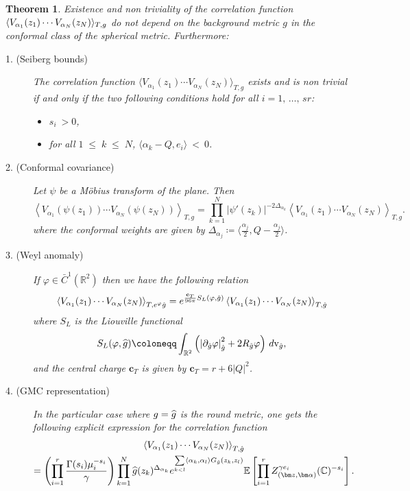 \documentclass[10pt]{amsart}
\newtheorem{theo}{Theorem}[section]
\theoremstyle{definition}\newtheorem{defi}[theo]{Definition}\newtheorem{rema}[theo]{Remark}\newtheorem{exam}[theo]{Example}\newtheorem{exem}[theo]{Example}\newtheorem{nota}[theo]{Notation}
\renewcommand{\leq}{\;\leqslant\;}
\newcommand{\rmv}{\mathrm{v}}
\newcommand{\C}{\mathbb{C}}
\newcommand{\R}{\mathbb{R}}
\newcommand{\E}{\mathbb{E}}
\newcommand{\bfc}{\mathbf{c}}
\newcommand{\ps}[1]{\langle #1 \rangle}
\let\oldhat\hat
\renewcommand*{\hat}[1]{\mathchoice{\widehat{#1}}{\widehat{#1}}{\oldhat{#1}}{\oldhat{#1}}}
\begin{document}
\begin{theo}\label{propcorrel1}
Existence and non triviality of the correlation function $ \langle V_{\alpha_1}(z_1)\linebreak \cdots V_{\alpha_N}(z_N) \rangle_{T,g} $ do not depend on the background metric $g$ in the conformal class of the spherical metric. Furthermore:
\begin{description}
\item[1. (Seiberg bounds)] The correlation function $ \langle V_{\alpha_1}(z_1) \cdots V_{\alpha_N}(z_N) \rangle_{T,g} $ exists and is non trivial if and only if the two following conditions hold for all $i=1,\,\dots,\,sr$:
\begin{itemize}
\item $s_i \: >0$,
\item for all $1\leq k\leq N$, $\langle\alpha_k-Q, e_i \rangle \: < \: 0$.
\end{itemize}
\item[2. (Conformal covariance)\label{item2}] Let $\psi$ be a M\"obius transform of the plane. Then
\begin{equation*}
\left\langle V_{\alpha_1}(\psi (z_1)) \cdots V_{\alpha_N}(\psi (z_N)) \right\rangle_{T,g}= \prod_{k=1}^N\left|\psi'(z_k)\right|^{-2\Delta_{\alpha_k}}\left\langle V_{\alpha_1}(z_1) \cdots V_{\alpha_N}(z_N)\right\rangle_{T,g}.
\end{equation*}
where the conformal weights are given by $\Delta_{\alpha_j}\coloneqq \ps{ \frac{\alpha_j}2, Q-\frac{\alpha_j}{2}}$.
\item[3. (Weyl anomaly)\label{item3}] If $\varphi\in\bar{C}^1(\R^2)$ then we have the following relation
\begin{equation*}
\left\langle V_{\alpha_1}(z_1) \cdots V_{\alpha_N}(z_N)\right\rangle_{T,e^\varphi \hat g} =e^{ \frac{\bfc_T}{96 \pi}S_L(\varphi,\hat g) } \left\langle V_{\alpha_1}(z_1) \cdots V_{\alpha_N}(z_N) \right\rangle_{T,\hat{g}}
\end{equation*}
where $S_L$ is the Liouville functional
\[
S_L(\varphi,\hat g)\coloneqq \int_{\R^2}\left(\left|\partial_{\hat{g}} \varphi\right|^2_{\hat{g}} + 2 R_{\hat{g}} \varphi \right) \,d\rmv_{\hat{g}},
\]
and the central charge $\bfc_T$ is given by $\bfc_T= r + 6 |Q|^2 $.
\item[4. (GMC representation)] In the particular case where $g=\hat{g}$ is the round metric, one gets the following explicit expression for the correlation function
\begin{multline}\label{expressioncorrels}
\left\langle V_{\alpha_1}(z_1) \cdots V_{\alpha_N}(z_N) \right\rangle_{T,\hat g} \\
= \left (\prod_{i=1}^{r} \frac{\Gamma (s_i)\mu_i^{- s_i}}\gamma \right)\prod_{k=1}^N \hat g (z_k)^{\Delta_{\alpha_k}} e^{ \sum\limits_{ k < l} \langle\alpha_k,\alpha_l \rangle G_{\hat g}(z_k,z_l) } \E \left [\prod_{i=1}^{r} Z_{(\bm z,\bm \alpha)}^{\gamma e_i} (\C)^{- s_i} \right].
\end{multline}
\end{description}
\end{theo}
\end{document}
